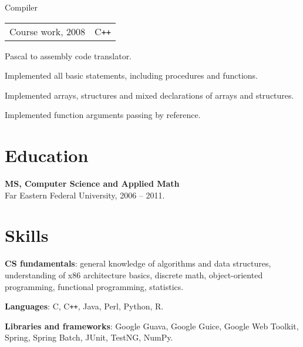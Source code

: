 \documentclass[a4paper]{article}
\begin{document}
\begin{multicols}{2}
  \begin{project2}{Compiler}{\begin{tabular}{@{}l|l}Course work, 2008 & C\texttt{++}\\\end{tabular}}
    Pascal to assembly code translator.
    \begin{items}
    \item Implemented all basic statements, including procedures and functions.
    \item Implemented arrays, structures and mixed declarations of arrays and structures.
    \item Implemented function arguments passing by reference.
    \end{items}
  \end{project2}
\end{multicols}

\section{Education}
\begin{multicols}{2}
  \raggedcolumns
  \begin{items}
  \item \textbf{MS, Computer Science and Applied Math}\\
    Far Eastern Federal University, 2006 -- 2011.
  \end{items}
  \columnbreak
  \hspace{10mm}
\end{multicols}

\section{Skills}
\begin{multicols}{2}
  \raggedcolumns
  \begin{items}
  \item \textbf{CS fundamentals}: general knowledge of algorithms and data
    structures, understanding of x86 architecture basics, discrete math,
    object-oriented programming, functional programming, statistics.

    \columnbreak

  \item \textbf{Languages}: C, C\texttt{++}, Java, Perl, Python, R.
  \item \textbf{Libraries and frameworks}: Google Guava, Google Guice,
    Google Web Toolkit, Spring, Spring Batch, JUnit, TestNG, NumPy.
  \end{items}
\end{multicols}
\end{document}
